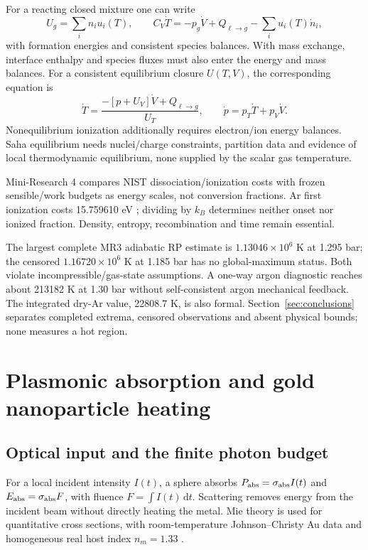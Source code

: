 \documentclass[11pt,a4paper]{article}
\newcommand{\dd}{\mathrm d}
\begin{document}
For a reacting closed mixture one can write
\begin{equation}
U_g=\sum_i n_i u_i(T),\qquad
C_V\dot T=-p_g\dot V+Q_{\ell\to g}-\sum_i u_i(T)\dot n_i,
\end{equation}
with formation energies and consistent species balances. With mass exchange, interface enthalpy and species fluxes must also enter the energy and mass balances. For a consistent equilibrium closure $U(T,V)$, the corresponding equation is
\begin{equation}
\dot T=\frac{-[p+U_V]\dot V+Q_{\ell\to g}}{U_T},\qquad
\dot p=p_T\dot T+p_V\dot V.
\end{equation}
Nonequilibrium ionization additionally requires electron/ion energy balances. Saha equilibrium needs nuclei/charge constraints, partition data and evidence of local thermodynamic equilibrium, none supplied by the scalar gas temperature.

Mini-Research 4 compares NIST dissociation/ionization costs with frozen sensible/work budgets as energy scales, not conversion fractions.
Ar first ionization costs 15.759610 eV \cite{nistgas}; dividing by $k_B$ determines neither onset nor ionized fraction. Density, entropy, recombination and time remain essential.

The largest complete MR3 adiabatic RP estimate is $1.13046\times10^6$ K at 1.295 bar; the censored $1.16720\times10^6$ K at 1.185 bar has no global-maximum status. Both violate incompressible/gas-state assumptions. A one-way argon diagnostic reaches about 213182 K at 1.30 bar without self-consistent argon mechanical feedback.
The integrated dry-Ar value, 22808.7 K, is also formal. Section~\ref{sec:conclusions} separates completed extrema, censored observations and absent physical bounds; none measures a hot region.
\clearpage
\section{Plasmonic absorption and gold nanoparticle heating}
\subsection{Optical input and the finite photon budget}
For a local incident intensity $I(t)$, a sphere absorbs $P_{\rm abs}=\sigma_{\rm abs}I(t)$ and $E_{\rm abs}=\sigma_{\rm abs}F$, with fluence $F=\int I(t)\,\dd t$. Scattering removes energy from the incident beam without directly heating the metal. Mie theory is used for quantitative cross sections, with room-temperature Johnson--Christy Au data and homogeneous real host index $n_m=1.33$ \cite{jc}.
\end{document}
